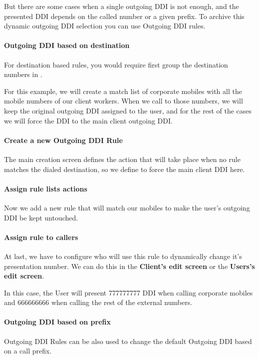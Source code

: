 \documentclass[letterpaper,10pt,spanish]{sphinxmanual}
\begin{document}
But there are some cases when a single outgoing DDI is not enough, and the
presented DDI depends on the called number or a given prefix. To archive this
dynamic outgoing DDI selection you can use Outgoing DDI rules.


\paragraph{Outgoing DDI based on destination}
\label{administration_portal/client/vpbx/user_configuration/outgoing_ddi_rules:outgoing-ddi-based-on-destination}
For destination based rules, you would require first group the destination
numbers in {\hyperref[administration_portal/client/vpbx/routing_tools/match_lists:match\string-lists]{}}.

For this example, we will create a match list of corporate mobiles with all
the mobile numbers of our client workers. When we call to those numbers, we
will keep the original outgoing DDI assigned to the user, and for the rest of
the cases we will force the DDI to the main client outgoing DDI.
\paragraph{Create a new Outgoing DDI Rule}

The main creation screen defines the action that will take place when no rule
matches the dialed destination, so we define to force the main client DDI here.
\paragraph{Assign rule lists actions}

Now we add a new rule that will match our mobiles to make the user's outgoing
DDI be kept untouched.
\paragraph{Assign rule to callers}

At last, we have to configure who will use this rule to dynamically change it's
presentation number. We can do this in the \textbf{Client's edit screen} or the
\textbf{Users's edit screen}.

In this case, the User will present 777777777 DDI when calling corporate mobiles
and 666666666 when calling the rest of the external numbers.


\paragraph{Outgoing DDI based on prefix}
\label{administration_portal/client/vpbx/user_configuration/outgoing_ddi_rules:outgoing-ddi-based-on-prefix}
Outgoing DDI Rules can be also used to change the default Outgoing DDI based on
a call prefix.
\end{document}

